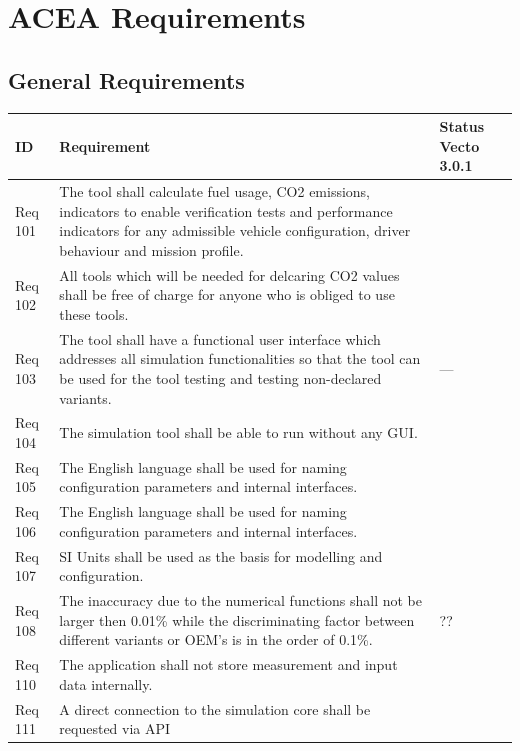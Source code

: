 \section{ACEA Requirements} %
\label{sec:subsection_name}


\subsection{General Requirements} %
\label{sub:general_requirements}


\begin{tabular}{L{\IdColWidth}|L{\ReqColWidth}|M{\StatusColWidth}}
ID & Requirement & Status Vecto 3.0.1 \\ \hline\hline
Req 101	& The tool shall calculate fuel usage, CO2 emissions, indicators to enable verification tests and performance indicators for any admissible vehicle configuration, driver behaviour and mission profile.  & 
	\Vcheck	\\ \hline
Req 102 & All tools which will be needed for delcaring CO2 values shall be free of charge for anyone who is obliged to use these tools. & 
	\Vcheck	\\ \hline
Req 103 & The tool shall have a functional user interface which addresses all simulation functionalities so that the tool can be used for the tool testing and testing non-declared variants. & 
	---	\\ \hline
Req 104 & The simulation tool shall be able to run without any GUI. & 
	\Vcheck	\\ \hline
Req 105 & The English language shall be used for naming configuration parameters and internal interfaces. & 
	\Vcheck	\\ \hline
Req 106 & The English language shall be used for naming configuration parameters and internal interfaces. & 
	\Vcheck	\\ \hline
Req 107 & SI Units shall be used as the basis for modelling and configuration. & 
	\Vcheck	\\ \hline
Req 108 & The inaccuracy due to the numerical functions shall not be larger then 0.01\% while the discriminating factor between different variants or OEM's is in the order of 0.1\%. & 
	??	\\ \hline
Req 110 & The application shall not store measurement and input data internally. & 
	\Vcheck	\\ \hline
Req 111 & A direct connection to the simulation core shall be requested via API & 
	\Vtodo	\\ \hline
\end{tabular}

